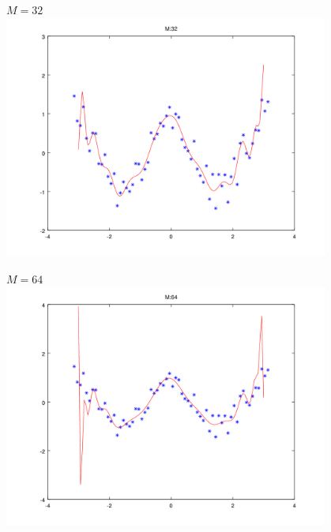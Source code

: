 \documentclass{article}
\begin{document}
\begin{minipage}[t]{0.5\textwidth}
	\centering
	$M = 32$ \\
	\includegraphics[width = 0.8\textwidth]{images/32}
	
	$M = 64$ \\
	\includegraphics[width = 0.8\textwidth]{images/64}
\end{minipage}
\end{document}
